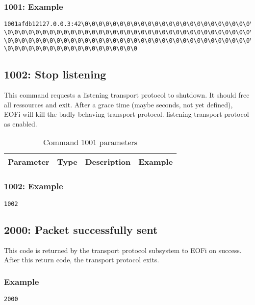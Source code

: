 \documentclass[12pt,a4paper]{book}
\begin{document}
\subsubsection{1001: Example}
\begin{verbatim}
1001afdb12127.0.0.3:42\0\0\0\0\0\0\0\0\0\0\0\0\0\0\0\0\0\0\0\0\0\0\0\0\0
\0\0\0\0\0\0\0\0\0\0\0\0\0\0\0\0\0\0\0\0\0\0\0\0\0\0\0\0\0\0\0\0\0\0\0\0
\0\0\0\0\0\0\0\0\0\0\0\0\0\0\0\0\0\0\0\0\0\0\0\0\0\0\0\0\0\0\0\0\0\0\0\0
\0\0\0\0\0\0\0\0\0\0\0\0\0\0\0\0\0\0\0
\end{verbatim}
\subsection{1002: Stop listening}
%
This command requests a listening transport protocol to 
shutdown. It should free all ressources and exit.
After a grace time (maybe seconds, not yet defined), EOFi will kill the badly
behaving transport protocol.
listening transport protocol as enabled.
\begin{longtable}{|c|c|c|c|}
\caption{Command 1001 parameters}\\
\hline
\textbf{Parameter} & \textbf{Type} & \textbf{Description} & \textbf{Example}\\
\hline
\end{longtable}
\subsubsection{1002: Example}
\begin{verbatim}
1002
\end{verbatim}
\subsection{2000: Packet successfully sent}
This code is returned by the transport protocol subsystem to EOFi on success.
After this return code, the transport protocol exits.
\subsubsection{Example}
\begin{verbatim}
2000
\end{verbatim}
\end{document}
